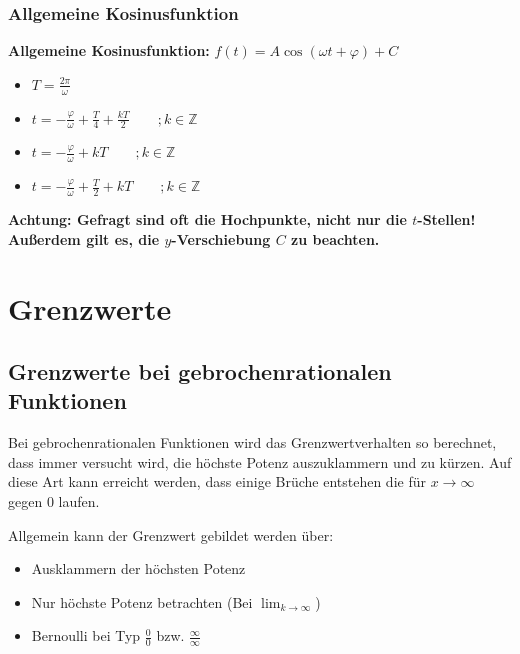 \documentclass[12pt, a4paper]{scrreprt}
\begin{document}
\subsection{Allgemeine Kosinusfunktion}

\textbf{Allgemeine Kosinusfunktion:} \(f(t) = A \cos(\omega t + \varphi) + C\)

\begin{itemize}
\item {} \(T = \frac{2\pi}{\omega}\)
\item {} \(t = - \frac{\varphi}{\omega} + \frac{T}{4} + \frac{kT}{2} \qquad ;k \in \mathbb{Z}\)
\item {} \(t = - \frac{\varphi}{\omega} + kT \qquad ;k \in \mathbb{Z}\)
\item {} \(t = - \frac{\varphi}{\omega} + \frac{T}{2} + kT \qquad ;k \in \mathbb{Z}\)
\end{itemize}

\textbf{Achtung: Gefragt sind oft die Hochpunkte, nicht nur die \(t\)-Stellen!}\\
\textbf{Außerdem gilt es, die \(y\)-Verschiebung \(C\) zu beachten.}

\chapter{Grenzwerte}

\section{Grenzwerte bei gebrochenrationalen Funktionen}

Bei gebrochenrationalen Funktionen wird das Grenzwertverhalten so berechnet, dass immer versucht wird, die höchste Potenz auszuklammern und zu kürzen. Auf diese Art kann erreicht werden, dass einige Brüche entstehen die für \(x \rightarrow \infty\) gegen 0 laufen.

Allgemein kann der Grenzwert gebildet werden über:

\begin{itemize}
\item Ausklammern der höchsten Potenz
\item Nur höchste Potenz betrachten (Bei \(\lim_{k \rightarrow \infty}\))
\item Bernoulli bei Typ \(\frac{0}{0}\) bzw. \(\frac{\infty}{\infty}\)
\end{itemize}
\end{document}
